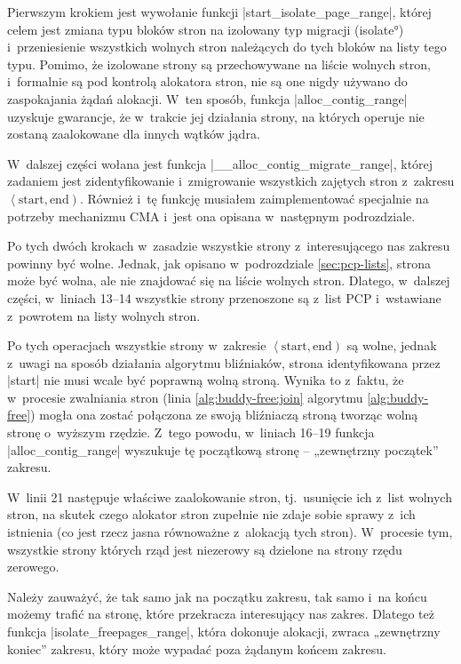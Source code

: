 Pierwszym krokiem jest wywołanie funkcji
\code|start_isolate_page_range|, której celem jest zmiana typu bloków
stron na izolowany typ migracji (\ang{isolate}) i~przeniesienie
wszystkich wolnych stron należących do tych bloków na listy tego typu.
Pomimo, że izolowane strony są przechowywane na liście wolnych stron,
i~formalnie są pod kontrolą alokatora stron, nie są one nigdy używano
do zaspokajania żądań alokacji.  W~ten sposób, funkcja
\code|alloc_contig_range| uzyskuje gwarancje, że w~trakcie jej
działania strony, na których operuje nie zostaną zaalokowane dla
innych wątków jądra.

W~dalszej części wołana jest funkcja
\code|__alloc_contig_migrate_range|, której zadaniem jest
zidentyfikowanie i~zmigrowanie wszystkich zajętych stron z~zakresu
$\left<\mathrm{start}, \mathrm{end}\right)$.  Również i~tę funkcję
musiałem zaimplementować specjalnie na potrzeby mechanizmu CMA i~jest
ona opisana w~następnym podrozdziale.

Po tych dwóch krokach w~zasadzie wszystkie strony z~interesującego nas
zakresu powinny być wolne.  Jednak, jak opisano w~podrozdziale
\ref{sec:pcp-lists}, strona może być wolna, ale nie znajdować się na
liście wolnych stron.  Dlatego, w~dalszej części, w~liniach 13--14
wszystkie strony przenoszone są z~list PCP i~wstawiane z~powrotem na
listy wolnych stron.

Po tych operacjach wszystkie strony w~zakresie $\left<\mathrm{start},
\mathrm{end}\right)$ są wolne, jednak z~uwagi na sposób działania
algorytmu bliźniaków, strona identyfikowana przez \code|start| nie
musi wcale być poprawną wolną stroną.  Wynika to z~faktu, że
w~procesie zwalniania stron (linia \ref{alg:buddy-free:join} algorytmu
\ref{alg:buddy-free}) mogła ona zostać połączona ze swoją bliźniaczą
stroną tworząc wolną stronę o~wyższym rzędzie.  Z~tego powodu,
w~liniach 16--19 funkcja \code|alloc_contig_range| wyszukuje tę
początkową stronę -- „zewnętrzny początek” zakresu.

W~linii 21 następuje właściwe zaalokowanie stron, tj.\ usunięcie ich
z~list wolnych stron, na skutek czego alokator stron zupełnie nie
zdaje sobie sprawy z~ich istnienia (co jest rzecz jasna równoważne
z~alokacją tych stron).  W~procesie tym, wszystkie strony których rząd
jest niezerowy są dzielone na strony rzędu zerowego.

Należy zauważyć, że tak samo jak na początku zakresu, tak samo i~na
końcu możemy trafić na stronę, które przekracza interesujący nas
zakres.  Dlatego też funkcja \code|isolate_freepages_range|,
która dokonuje alokacji, zwraca „zewnętrzny koniec” zakresu, który
może wypadać poza żądanym końcem zakresu.

